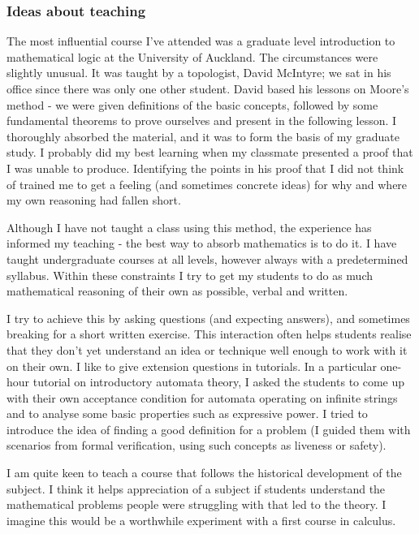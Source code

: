 \documentclass[12pt]{article}
\theoremstyle{plain} \numberwithin{equation}{section}
\theoremstyle{definition}
\begin{document}
\thispagestyle{fancy}

\subsubsection*{Ideas about teaching}

The most influential course I've attended was a graduate level introduction to mathematical logic at the University of Auckland. The circumstances were slightly unusual. It was taught by a topologist, David McIntyre; we sat in his office since there was only one other student. David based his lessons on Moore's method - we were given definitions of the basic concepts, followed by some fundamental theorems to prove ourselves and present in the following lesson. I thoroughly absorbed the material, and it was to form the basis of my graduate study. I probably did my best learning when my classmate presented a proof that I was unable to produce. Identifying the points in his proof that I did not think of trained me to get a feeling (and sometimes concrete ideas) for why and where my own reasoning had fallen short.

Although I have not taught a class using this method, the experience has informed my teaching - the best way to absorb mathematics is to do it. I have taught undergraduate courses at all levels, however always with a predetermined syllabus. Within these constraints I try to get my students to do as much mathematical reasoning of their own as possible, verbal and written. 

I try to achieve this by asking questions (and expecting answers), and sometimes breaking for a short written exercise. This interaction often helps students realise that they don't yet understand an idea or technique well enough to work with it on their own. I like to give extension questions in tutorials. In a particular one-hour tutorial on introductory automata theory, I asked the students to come up with their own acceptance condition for automata operating on infinite strings and to analyse some basic properties such as expressive power. I tried to introduce the idea of finding a good definition for a problem (I guided them with scenarios from formal verification, using such concepts as liveness or safety).

I am quite keen to teach a course that follows the historical
development of the subject. I think it helps appreciation of a subject if students understand the mathematical problems people were struggling with that led to the theory. I imagine this would be a worthwhile experiment with a first course in calculus.
\end{document}
